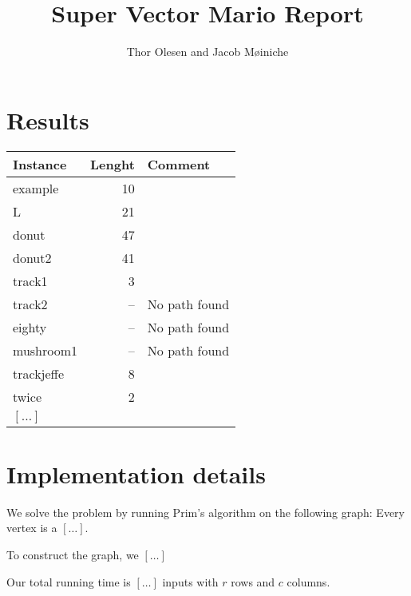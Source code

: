 \documentclass{tufte-handout}
\title{Super Vector Mario Report}
\author{Thor Olesen and Jacob Møiniche}
\begin{document}
  \maketitle

  \section{Results}

\bigskip
  \begin{tabular}{lrl}\toprule
    Instance & Lenght & Comment  \\\midrule
    example & 10 &  \\
    L & 21 & \\
    donut & 47 & \\
    donut2 & 41 & \\
    track1 & 3 & \\
    track2 & -- & No path found \\ 
    eighty & -- & No path found \\
    mushroom1 & -- & No path found \\
    trackjeffe & 8 & \\
    twice & 2 & \\
    $[\ldots]$ \\\bottomrule
  \end{tabular}
\bigskip


  \section{Implementation details}

  We solve the problem by running Prim's algorithm
  on the following graph:
  Every vertex is a $[\ldots]$.

  To construct the graph, we $[\ldots]$

  Our total running time is $[\ldots]$ inputs with $r$ rows and $c$ columns.
\end{document}
